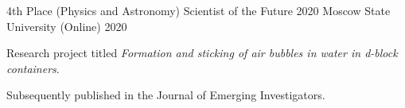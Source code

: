 



\begin{cventries}
  \cventry
  {4th Place (Physics and Astronomy)} %
  {Scientist of the Future 2020} %
  {Moscow State University (Online)} %
  {2020} %
  {
    \begin{cvitems}
      \item Research project titled \emph{Formation and sticking of air bubbles in water in d-block containers}.
      \item Subsequently published in the Journal of Emerging Investigators.  
    \end{cvitems}
  }
\end{cventries}


  

